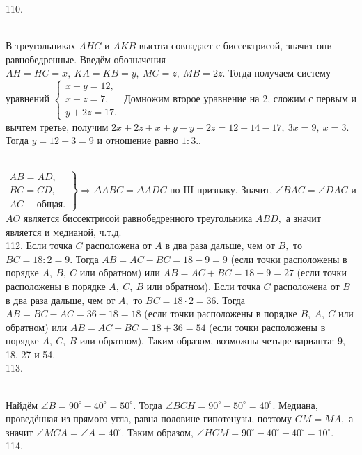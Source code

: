 110. \begin{figure}[ht!]
\end{figure}\\
В треугольниках $AHC$ и $AKB$ высота совпадает с биссектрисой, значит они равнобедренные. Введём обозначения $AH=HC=x,\ KA=KB=y,\ MC=z,\ MB=2z.$ Тогда получаем систему уравнений $\begin{cases} x+y=12,\\ x+z=7,\\ y+2z=17.\end{cases}$ Домножим второе уравнение на 2, сложим с первым и вычтем третье, получим $2x+2z+x+y-y-2z=12+14-17,\ 3x=9,\ x=3.$ Тогда $y=12-3=9$ и отношение равно $1:3.$\newpage{}. \begin{figure}[ht!]
\end{figure}\\
$\left.\begin{array}{l}AB=AD,\\
BC=CD,\\
AC\text{--- общая.}  \end{array}\right\}\Rightarrow \Delta ABC=\Delta ADC\text{ по III признаку.}$ Значит, $\angle BAC=\angle DAC$ и $AO$ является биссектрисой равнобедренного треугольника $ABD,$ а значит является и медианой, ч.т.д.\\
112. Если точка $C$ расположена от $A$ в два раза дальше, чем от $B,$ то $BC=18:2=9.$ Тогда $AB=AC-BC=18-9=9$ (если точки расположены в порядке $A,\ B,\ C$ или обратном) или $AB=AC+BC=18+9=27$ (если точки расположены в порядке $A,\ C,\ B$ или обратном). Если точка $C$ расположена от $B$ в два раза дальше, чем от $A,$ то $BC=18\cdot2=36.$ Тогда $AB=BC-AC=36-18=18$ (если точки расположены в порядке $B,\ A,\ C$ или обратном) или $AB=AC+BC=18+36=54$ (если точки расположены в порядке $A,\ C,\ B$ или обратном). Таким образом, возможны четыре варианта: 9, 18, 27 и 54.\\
113. \begin{figure}[ht!]
\end{figure}\\
Найдём $\angle B=90^\circ-40^\circ=50^\circ.$ Тогда $\angle BCH=90^\circ-50^\circ=40^\circ.$ Медиана, проведённая из прямого угла, равна половине гипотенузы, поэтому $CM=MA,$ а значит $\angle MCA=\angle A=40^\circ.$ Таким образом, $\angle HCM=90^\circ-40^\circ-40^\circ=10^\circ.$\\
114. \begin{figure}[ht!]
\end{figure}\\
